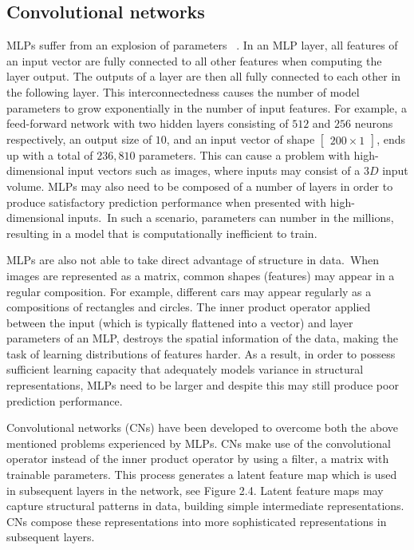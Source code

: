 
\subsection{Convolutional networks}

MLPs suffer from an explosion of parameters \unskip ~\citep{krizhevsky2012imagenet}. In an MLP layer, all features of an input vector are fully connected to all other features when computing the layer output. The outputs of a layer are then all fully connected to each other in the following layer. This interconnectedness causes the number of model parameters to grow exponentially in the number of input features. For example, a feed-forward network with two hidden layers consisting of $512$ and $256$ neurons respectively, an output size of $10$, and an input vector of shape $\left [ \begin{matrix} 200 \times 1 \end{matrix} \right] $, ends up with a total of $236,810$ parameters. This can cause a problem with high-dimensional input vectors such as images, where inputs may consist of a $ 3D $ input volume. MLPs may also need to be composed of a number of layers in order to produce satisfactory prediction performance when presented with high-dimensional inputs.\ In such a scenario, parameters can number in the millions, resulting in a model that is computationally inefficient to train. \par

\noindent MLPs are also not able to take direct advantage of structure in data.\ When images are represented as a matrix, common shapes (features) may appear in a regular composition. For example, different cars may appear regularly as a compositions of rectangles and circles. The inner product operator applied between the input (which is typically flattened into a vector) and layer parameters of an MLP, destroys the spatial information of the data, making the task of learning distributions of features harder. As a result, in order to possess sufficient learning capacity that adequately models variance in structural representations, MLPs need to be larger and despite this may still produce poor prediction performance. \par

\noindent Convolutional networks (CNs) have been developed to overcome both the above mentioned problems experienced by MLPs. CNs make use of the convolutional operator instead of the inner product operator by using a filter, a matrix with trainable parameters. This process generates a latent feature map which is used in subsequent layers in the network, see Figure 2.4. Latent feature maps may capture structural patterns in data, building simple intermediate representations. CNs compose these representations into more sophisticated representations in subsequent layers. \par 

